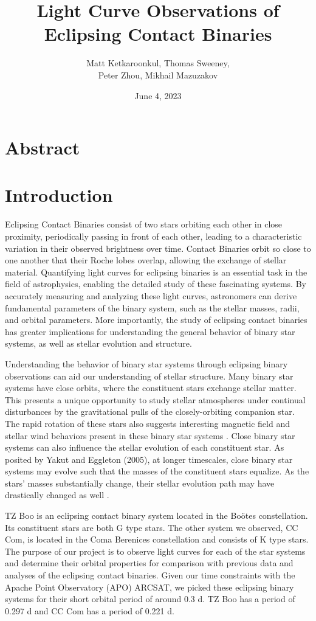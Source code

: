 \documentclass[12pt]{article}
\title{\vspace{-2em} {\bf Light Curve Observations of Eclipsing Contact Binaries}}
\author{Matt Ketkaroonkul, Thomas Sweeney, \\ Peter Zhou, Mikhail Mazuzakov}
\date{June 4, 2023}
\begin{document}
\maketitle

\section{Abstract}
\section{Introduction}

Eclipsing Contact Binaries consist of two stars orbiting each other in close proximity, periodically passing in front of each other, leading to a characteristic variation in their observed brightness over time. Contact Binaries orbit so close to one another that their Roche lobes overlap, allowing the exchange of stellar material. Quantifying light curves for eclipsing binaries is an essential task in the field of astrophysics, enabling the detailed study of these fascinating systems. By accurately measuring and analyzing these light curves, astronomers can derive fundamental parameters of the binary system, such as the stellar masses, radii, and orbital parameters. More importantly, the study of eclipsing contact binaries has greater implications for understanding the general behavior of binary star systems, as well as stellar evolution and structure.

Understanding the behavior of binary star systems through eclipsing binary observations can aid our understanding of stellar structure. Many binary star systems have close orbits, where the constituent stars exchange stellar matter. This presents a unique opportunity to study stellar atmospheres under continual disturbances by the gravitational pulls of the closely-orbiting companion star. The rapid rotation of these stars also suggests interesting magnetic field and stellar wind behaviors present in these binary star systems \cite{2001icbs.book.....H}. Close binary star systems can also influence the stellar evolution of each constituent star. As posited by Yakut and Eggleton (2005), at longer timescales, close binary star systems may evolve such that the masses of the constituent stars equalize. As the stars’ masses substantially change, their stellar evolution path may have drastically changed as well \cite{2005ApJ...629.1055Y}.

	TZ Boo is an eclipsing contact binary system located in the Boötes constellation. Its constituent stars are both G type stars. The other system we observed, CC Com, is located in the Coma Berenices constellation and consists of K type stars. The purpose of our project is to observe light curves for each of the star systems and determine their orbital properties for comparison with previous data and analyses of the eclipsing contact binaries. Given our time constraints with the Apache Point Observatory (APO) ARCSAT, we picked these eclipsing binary systems for their short orbital period of around 0.3 d. TZ Boo has a period of 0.297 d and CC Com has a period of 0.221 d. 
\end{document}
